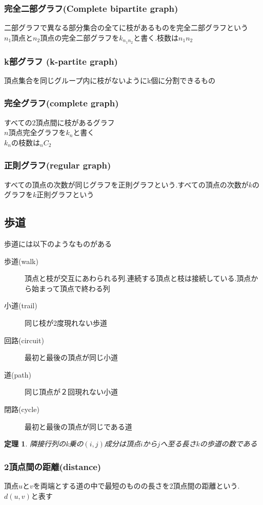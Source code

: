 \documentclass[a4j,10.5pt]{jarticle}
\theoremstyle{break}
\newtheorem{theo}{定理}[section]
\begin{document}
\subsubsection*{完全二部グラフ(Complete bipartite graph)}
二部グラフで異なる部分集合の全てに枝があるものを完全二部グラフという\\
$n_1$頂点と$n_2$頂点の完全二部グラフを$k_{n_1 n_2}$と書く.枝数は$n_1n_2$

\subsubsection*{k部グラフ (k-partite graph)}
頂点集合を同じグループ内に枝がないようにk個に分割できるもの

\subsubsection*{完全グラフ(complete graph)}
すべての2頂点間に枝があるグラフ\\
$n$頂点完全グラフを$k_n$と書く\\
$k_n$の枝数は${}_nC_2$

\subsubsection*{正則グラフ(regular graph)}
すべての頂点の次数が同じグラフを正則グラフという.すべての頂点の次数が$k$のグラフを$k$正則グラフという

\subsection{歩道}
歩道には以下のようなものがある
\begin{description}
\item[歩道(walk)] 頂点と枝が交互にあわられる列.連続する頂点と枝は接続している.頂点から始まって頂点で終わる列
\item[小道(trail)] 同じ枝が2度現れない歩道
\item[回路(circuit)] 最初と最後の頂点が同じ小道
\item[道(path)] 同じ頂点が２回現れない小道
\item[閉路(cycle)] 最初と最後の頂点が同じである道
\end{description}

\begin{theo}
隣接行列のk乗の$(i,j)$成分は頂点$i$から$j$へ至る長さ$k$の歩道の数である
\end{theo}

\subsubsection{2頂点間の距離(distance)}
頂点$u$と$v$を両端とする道の中で最短のものの長さを2頂点間の距離という.$d(u,v)$と表す
\end{document}
